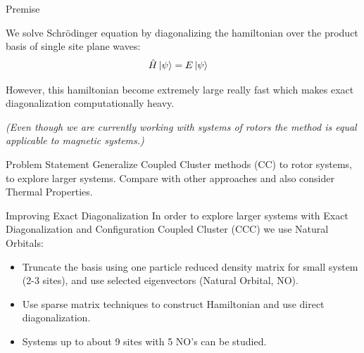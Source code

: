 \documentclass[final]{beamer}
\newlength{\onecolwid}
\begin{document}
\begin{frame}[t]
\begin{columns}[t]
\begin{column}{\onecolwid}
\begin{block}{Premise}

We solve Schrödinger equation by diagonalizing the hamiltonian over the product basis of single site plane waves:
\begin{align}
    \hat{H}\ket{\psi} &= E\ket{\psi}
\end{align}

However, this hamiltonian become extremely large really fast which makes exact diagonalization computationally heavy.

\textit{(Even though we are currently working with systems of rotors the method is equal applicable to magnetic systems.)}

\begin{alertblock}{Problem Statement}
Generalize Coupled Cluster methods (CC) to rotor systems, to explore larger systems. Compare with other approaches and also consider Thermal Properties.
\end{alertblock}

\end{block}
\vspace{-2em}
\begin{block}{Improving Exact Diagonalization}
In order to explore larger systems with Exact Diagonalization and Configuration Coupled Cluster (CCC) we use Natural Orbitals:
\begin{itemize}
  \item Truncate the basis using one particle reduced density matrix for small system (2-3 sites), and use selected eigenvectors (Natural Orbital, NO).
  \item Use sparse matrix techniques to construct Hamiltonian and use direct diagonalization.
  \item Systems up to about 9 sites with 5 NO's can be studied.
\end{itemize}


\end{block}
\end{column}
\end{columns}
\end{frame}
\end{document}
